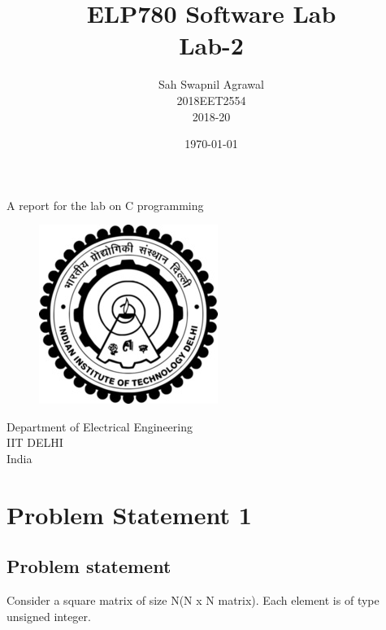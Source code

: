 \documentclass[12pt,a4paper]{article}
\title{ELP780 Software Lab\\Lab-2}
\author{Sah Swapnil Agrawal\\2018EET2554\\2018-20}
\date{\today}
\begin{document}
    \maketitle
    \begin{center}
    A report for the lab on C programming
    \end{center}
    \vspace{20pt}
    \begin{figure}[h!]
        \centering
        \includegraphics{iitd_logo.jpg}
    \end{figure}
    \begin{center}
    \vspace{40pt}
    Department of Electrical Engineering\\
    IIT DELHI\\
    India
        
    \end{center}
    \newpage
    \tableofcontents
    \newpage
    \section{Problem Statement 1}
        \subsection{Problem statement}
        Consider a square matrix of size N(N x N matrix). Each element is of type unsigned integer.\\
        
\end{document}
